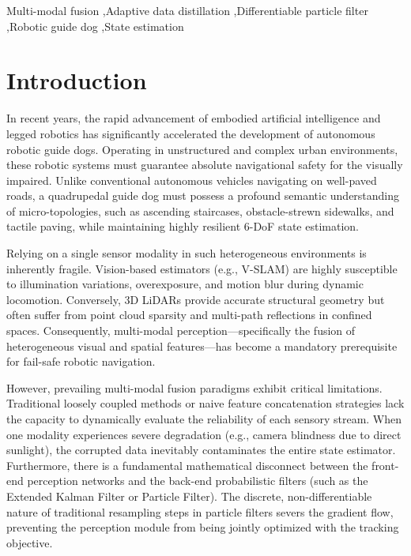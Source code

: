 \documentclass[final,3p,times]{elsarticle}
\begin{document}
\begin{frontmatter}
\begin{keyword}
Multi-modal fusion \sep Adaptive data distillation \sep Differentiable particle filter \sep Robotic guide dog \sep State estimation
\end{keyword}

\end{frontmatter}

\section{Introduction}
\label{sec:intro}
In recent years, the rapid advancement of embodied artificial intelligence and legged robotics has significantly accelerated the development of autonomous robotic guide dogs. Operating in unstructured and complex urban environments, these robotic systems must guarantee absolute navigational safety for the visually impaired. Unlike conventional autonomous vehicles navigating on well-paved roads, a quadrupedal guide dog must possess a profound semantic understanding of micro-topologies, such as ascending staircases, obstacle-strewn sidewalks, and tactile paving, while maintaining highly resilient 6-DoF state estimation.

Relying on a single sensor modality in such heterogeneous environments is inherently fragile. Vision-based estimators (e.g., V-SLAM) are highly susceptible to illumination variations, overexposure, and motion blur during dynamic locomotion. Conversely, 3D LiDARs provide accurate structural geometry but often suffer from point cloud sparsity and multi-path reflections in confined spaces. Consequently, multi-modal perception—specifically the fusion of heterogeneous visual and spatial features—has become a mandatory prerequisite for fail-safe robotic navigation.

However, prevailing multi-modal fusion paradigms exhibit critical limitations. Traditional loosely coupled methods or naive feature concatenation strategies lack the capacity to dynamically evaluate the reliability of each sensory stream. When one modality experiences severe degradation (e.g., camera blindness due to direct sunlight), the corrupted data inevitably contaminates the entire state estimator. Furthermore, there is a fundamental mathematical disconnect between the front-end perception networks and the back-end probabilistic filters (such as the Extended Kalman Filter or Particle Filter). The discrete, non-differentiable nature of traditional resampling steps in particle filters severs the gradient flow, preventing the perception module from being jointly optimized with the tracking objective.
\end{document}
